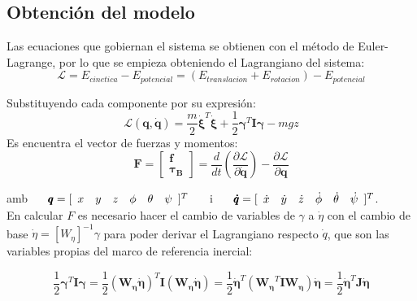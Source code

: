 \documentclass[twoside]{article}
\begin{document}
\subsection{Obtención del modelo}
Las ecuaciones que gobiernan el sistema se obtienen con el método de Euler-Lagrange, por lo que se empieza obteniendo el Lagrangiano del sistema:
\begin{equation}
\mathcal{L}=E_{cinetica} - E_{potencial} = (E_{translacion}+E_{rotacion})-E_{potencial}
\end{equation}

Substituyendo cada componente por su expresión:
\begin{equation}
\mathcal{L}(\pmb{q},\pmb{\dot{q}})=\frac{m}{2} \pmb{\dot{\xi}}^T \pmb{\dot{\xi}} + \frac{1}{2}\pmb{\gamma}^{T}\pmb{I}\pmb{\gamma} - mgz
\end{equation}
Es encuentra el vector de fuerzas y  momentos:
\begin{equation}
\pmb{F}=\left[ \begin{array}{c}
\pmb{f} \\
\pmb{\tau_B}
\end{array} \right] = \frac{d}{dt}\left(\frac{\partial \mathcal{L}}{\partial \pmb{\dot{q}}}\right)-\frac{\partial\mathcal{L}}{\partial \pmb{q}}
\end{equation}

amb $ \hspace{0.5cm} \pmb{q}=[\begin{array}{cccccc}
x & y & z & \phi & \theta & \psi
\end{array} ]^{T} \hspace{0.5cm}$ i $ \hspace{0.5cm} \pmb{\dot{q}}=[\begin{array}{cccccc}
\dot{x} & \dot{y} & \dot{z} & \dot{\phi} & \dot{\theta} & \dot{\psi}
\end{array} ]^{T}$.\\

En calcular $F$ es necesario hacer el cambio de variables de $\gamma$ a $\dot{\eta}$ con el cambio de base $\dot{\eta}=\left[ W_\eta \right]^{-1} \gamma$ para poder derivar el Lagrangiano respecto $\dot{q}$, que son las variables propias del marco de referencia inercial:

\begin{equation}
\frac{1}{2}\pmb{\gamma}^{T}\pmb{I}\pmb{\gamma} = \frac{1}{2}(\pmb{W_\eta} \pmb{\dot{\eta}})^{T}\pmb{I}(\pmb{W_\eta} \pmb{\dot{\eta}}) = \frac{1}{2}\pmb{\dot{\eta}}^{T}(\pmb{W_\eta} ^{T}\pmb{I}\pmb{W_\eta})\pmb{\dot{\eta}} = \frac{1}{2}\pmb{\dot{\eta}}^{T}\pmb{J}\pmb{\dot{\eta}}
\end{equation}
\end{document}
